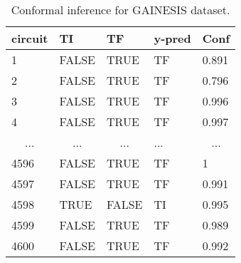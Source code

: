 \documentclass[9pt,conference]{IEEEtran}
\begin{document}
\begin{table}[t]
\centering
\caption{Conformal inference for GAINESIS dataset.}
\begin{tabular}{lllll}
\hline
\textbf{circuit}        & \textbf{TI}             & \textbf{TF}             & \textbf{y-pred} & \textbf{Conf}           \\ \hline
1                       & FALSE                   & TRUE                    & TF              & 0.891                   \\ \hline
2                       & FALSE                   & TRUE                    & TF              & 0.796                   \\ \hline
3                       & FALSE                   & TRUE                    & TF              & 0.996                   \\ \hline
4                       & FALSE                   & TRUE                    & TF              & 0.997                   \\ \hline
\multicolumn{1}{c}{...} & \multicolumn{1}{c}{...} & \multicolumn{1}{c}{...} & ...             & \multicolumn{1}{c}{...} \\ \hline
4596                    & FALSE                   & TRUE                    & TF              & 1                       \\ \hline
4597                    & FALSE                   & TRUE                    & TF              & 0.991                   \\ \hline
4598                    & TRUE                    & FALSE                   & TI              & 0.995                   \\ \hline
4599                    & FALSE                   & TRUE                    & TF              & 0.989                   \\ \hline
4600                    & FALSE                   & TRUE                    & TF              & 0.992                   \\ \hline
\end{tabular}
\label{tab:binary_cp}
\end{table}
\end{document}
